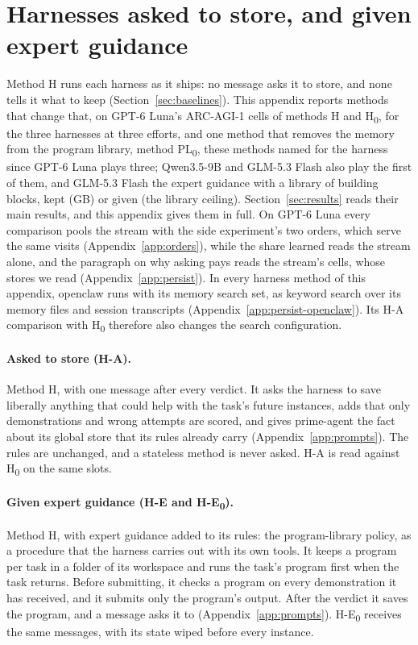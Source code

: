\section{Harnesses asked to store, and given expert guidance}
\label{app:ablations}

Method H runs each harness as it ships: no message asks it to store, and none tells it what to keep (Section~\ref{sec:baselines}). This appendix reports methods that change that, on GPT-6 Luna's ARC-AGI-1 cells of methods H and H\textsubscript{0}, for the three harnesses at three efforts, and one method that removes the memory from the program library, method PL\textsubscript{0}, these methods named for the harness since GPT-6 Luna plays three; Qwen3.5-9B and GLM-5.3 Flash also play the first of them, and GLM-5.3 Flash the expert guidance with a library of building blocks, kept (GB) or given (the library ceiling). Section~\ref{sec:results} reads their main results, and this appendix gives them in full. On GPT-6 Luna every comparison pools the stream with the side experiment's two orders, which serve the same visits (Appendix~\ref{app:orders}), while the share learned reads the stream alone, and the paragraph on why asking pays reads the stream's cells, whose stores we read (Appendix~\ref{app:persist}). In every harness method of this appendix, openclaw runs with its memory search set, as keyword search over its memory files and session transcripts (Appendix~\ref{app:persist-openclaw}). Its H-A comparison with H\textsubscript{0} therefore also changes the search configuration.

\paragraph{Asked to store (\mbox{H-A}).}
Method H, with one message after every verdict. It asks the harness to save liberally anything that could help with the task's future instances, adds that only demonstrations and wrong attempts are scored, and gives prime-agent the fact about its global store that its rules already carry (Appendix~\ref{app:prompts}). The rules are unchanged, and a stateless method is never asked. \mbox{H-A} is read against H\textsubscript{0} on the same slots.

\paragraph{Given expert guidance (\mbox{H-E} and \mbox{H-E\textsubscript{0}}).}
Method H, with expert guidance added to its rules: the program-library policy, as a procedure that the harness carries out with its own tools. It keeps a program per task in a folder of its workspace and runs the task's program first when the task returns. Before submitting, it checks a program on every demonstration it has received, and it submits only the program's output. After the verdict it saves the program, and a message asks it to (Appendix~\ref{app:prompts}). \mbox{H-E\textsubscript{0}} receives the same messages, with its state wiped before every instance.

